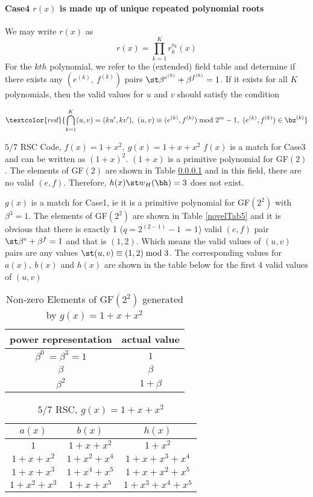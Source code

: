 \paragraph{Case4 $r(x)$ is made up of unique repeated polynomial roots\newline}
We may write $r(x)$ as $$r(x)=\prod_{k=1}^{K}r^{o_k}_k(x)$$ 
For the $kth$ polynomial, we refer to the (extended) field table and determine if there exists any $(e^{(k)},~f^{(k)})$ pairs $\st \beta^{e^{(k)}}+\beta^{f^{(k)}}=1$. If it exists for all $K$ polynomials, then the valid values for $u$ and $v$
 should satisfy the condition

 $$\textcolor{red}{\bigcap_{k=1}^{K} (u,v)=(ku',kv'),~(u,v) \equiv (e^{(k)},f^{(k)})\bmod 2^{m}-1,~(e^{(k)}, f^{(k)}) \in \bz^{(k)}} $$



\begin{example}
$5/7$ RSC Code, $f(x)=1+x^2,~g(x)=1+x+x^2$\newline
$f(x)$ is a match for Case3 and can be written as $(1+x)^2$. $(1+x)$ is a primitive polynomial for GF$(2)$. The elements of GF$(2)$ are shown in Table \ref{} and in this field, there are no valid $(e,f)$. Therefore, $h(x) \st w_H(\bh)=3$ does not exist.

$g(x)$ is a match for Case1, ie it is a primitive polynomial for GF$(2^2)$ with $\beta^{3}=1$. 
The elements of GF$(2^2)$ are shown in Table \ref{novelTab5} and it is obvious that there is exactly 1 ($q=2^{(2-1)}-1~=1$) valid $(e,f)$ pair $\st \beta^e+\beta^f = 1$ and that is $(1,2)$.
Which means the valid values of $(u,v)$ pairs are any values $\st (u,v) \equiv (1,2) \bmod 3$.  The corresponding values for $a(x),~b(x)$ and $h(x)$ are shown in the table below for the first 4 valid values of $(u,v)$

 \begin{table*}[h]
 \caption{Non-zero Elements of GF$(2^2)$ generated by $g(x)=1+x+x^2$}
\centering
 \begin{tabular}{c c} 
 \hline
 power representation & actual value \\ [0.5ex] 
 \hline\hline
$\beta^0~=\beta^3=1$ & $1$\\
\hline
$\beta$ & $\beta$\\
\hline
$\beta^2$ &  $1+\beta$\\
 \end{tabular}
 \label{novelTab7}
\end{table*}

\begin{table*}[h]
 \caption{$5/7$ RSC, $g(x)=1+x+x^2$}
\centering
 \begin{tabular}{c c c} 
 \hline
 $a(x)$ & $b(x)$ & $h(x)$\\ [0.5ex] 
 \hline\hline
$1$ & $1+x+x^2$ & $1+x^2$\\ 
\hline
$1+x+x^2$ &  $1+x^2+x^4$ & $1+x+x^3+x^4$ \\
\hline
$1+x+x^3$ & $1+x^4+x^5$ & $1+x+x^2+x^5$\\
\hline
$1+x^2+x^3$ & $1+x+x^5$  &$1+x^3+x^4+x^5$
 \end{tabular}
 \label{novelTab8}
\end{table*}
\end{example}


